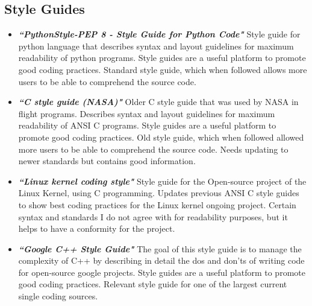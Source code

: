 \documentclass[a4paper, 10pt]{IEEEtran}
\begin{document}
\subsection{Style Guides}
\begin{itemize}
    \item \textbf{\textit{“PythonStyle-PEP 8 - Style Guide for Python Code"}}
    Style guide for python language that describes syntax and layout guidelines for maximum readability of python programs. Style guides are a useful platform to promote good coding practices. Standard style guide, which when followed allows more users to be able to comprehend the source code.
    \item \textbf{\textit{“C style guide (NASA)"}}
    Older C style guide that was used by NASA in flight programs. Describes syntax and layout guidelines for maximum readability of ANSI C programs. Style guides are a useful platform to promote good coding practices. Old style guide, which when followed allowed more users to be able to comprehend the source code. Needs updating to newer standards but contains good information.
    \item \textbf{\textit{“Linux kernel coding style"}}
    Style guide for the Open-source project of the Linux Kernel, using C programming. Updates previous ANSI C style guides to show best coding practices for the Linux kernel ongoing project. Certain syntax and standards I do not agree with for readability purposes, but it helps to have a conformity for the project.
    \item \textbf{\textit{“Google C++ Style Guide"}}
    The goal of this style guide is to manage the complexity of C++ by describing in detail the dos
    and don'ts of writing code for open-source google projects. Style guides are a useful platform to promote good coding practices. Relevant style guide for one of the largest current single coding sources.



\end{itemize}


\nocite{*}


\end{document}
